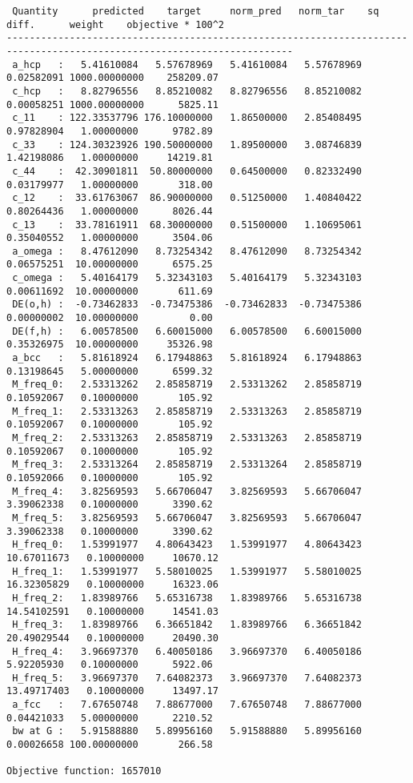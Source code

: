 \documentclass[11pt]{article}
\begin{document}
\begin{verbatim}
 Quantity      predicted    target     norm_pred   norm_tar    sq diff.      weight    objective * 100^2 
------------------------------------------------------------------------------------------------------------------------
 a_hcp   :   5.41610084   5.57678969   5.41610084   5.57678969   0.02582091 1000.00000000    258209.07
 c_hcp   :   8.82796556   8.85210082   8.82796556   8.85210082   0.00058251 1000.00000000      5825.11
 c_11    : 122.33537796 176.10000000   1.86500000   2.85408495   0.97828904   1.00000000      9782.89
 c_33    : 124.30323926 190.50000000   1.89500000   3.08746839   1.42198086   1.00000000     14219.81
 c_44    :  42.30901811  50.80000000   0.64500000   0.82332490   0.03179977   1.00000000       318.00
 c_12    :  33.61763067  86.90000000   0.51250000   1.40840422   0.80264436   1.00000000      8026.44
 c_13    :  33.78161911  68.30000000   0.51500000   1.10695061   0.35040552   1.00000000      3504.06
 a_omega :   8.47612090   8.73254342   8.47612090   8.73254342   0.06575251  10.00000000      6575.25
 c_omega :   5.40164179   5.32343103   5.40164179   5.32343103   0.00611692  10.00000000       611.69
 DE(o,h) :  -0.73462833  -0.73475386  -0.73462833  -0.73475386   0.00000002  10.00000000         0.00
 DE(f,h) :   6.00578500   6.60015000   6.00578500   6.60015000   0.35326975  10.00000000     35326.98
 a_bcc   :   5.81618924   6.17948863   5.81618924   6.17948863   0.13198645   5.00000000      6599.32
 M_freq_0:   2.53313262   2.85858719   2.53313262   2.85858719   0.10592067   0.10000000       105.92
 M_freq_1:   2.53313263   2.85858719   2.53313263   2.85858719   0.10592067   0.10000000       105.92
 M_freq_2:   2.53313263   2.85858719   2.53313263   2.85858719   0.10592067   0.10000000       105.92
 M_freq_3:   2.53313264   2.85858719   2.53313264   2.85858719   0.10592066   0.10000000       105.92
 M_freq_4:   3.82569593   5.66706047   3.82569593   5.66706047   3.39062338   0.10000000      3390.62
 M_freq_5:   3.82569593   5.66706047   3.82569593   5.66706047   3.39062338   0.10000000      3390.62
 H_freq_0:   1.53991977   4.80643423   1.53991977   4.80643423  10.67011673   0.10000000     10670.12
 H_freq_1:   1.53991977   5.58010025   1.53991977   5.58010025  16.32305829   0.10000000     16323.06
 H_freq_2:   1.83989766   5.65316738   1.83989766   5.65316738  14.54102591   0.10000000     14541.03
 H_freq_3:   1.83989766   6.36651842   1.83989766   6.36651842  20.49029544   0.10000000     20490.30
 H_freq_4:   3.96697370   6.40050186   3.96697370   6.40050186   5.92205930   0.10000000      5922.06
 H_freq_5:   3.96697370   7.64082373   3.96697370   7.64082373  13.49717403   0.10000000     13497.17
 a_fcc   :   7.67650748   7.88677000   7.67650748   7.88677000   0.04421033   5.00000000      2210.52
 bw at G :   5.91588880   5.89956160   5.91588880   5.89956160   0.00026658 100.00000000       266.58

Objective function: 1657010

\end{verbatim}
\end{document}
